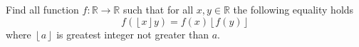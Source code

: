 Find all function $f:\mathbb{R}\rightarrow\mathbb{R}$ such that for all $x,y\in\mathbb{R}$ the following equality holds \[
f(\left\lfloor x\right\rfloor y)=f(x)\left\lfloor f(y)\right\rfloor \] where $\left\lfloor a\right\rfloor $ is greatest integer not greater than $a.$
